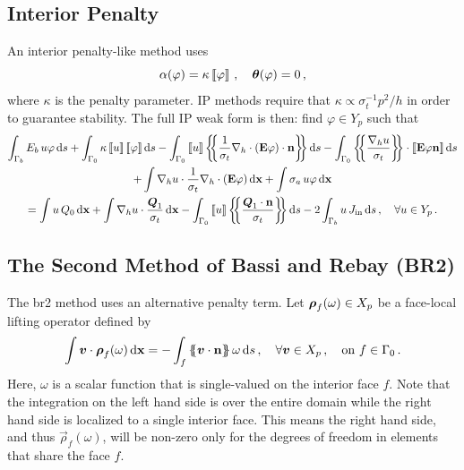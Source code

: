 \documentclass[../doc.tex]{subfiles}
\begin{document}
\subsection{Interior Penalty} \label{dgvef_sec:ip}
An interior penalty-like method uses 
	\begin{equation}
		\alpha(\varphi) = \kappa \left\llbracket\varphi \right\rrbracket \,, \quad \boldsymbol{\theta}(\varphi) = 0 \,, 
	\end{equation}
where $\kappa$ is the penalty parameter. IP methods require that $\kappa \propto \sigma_t^{-1} p^2/h$ in order to guarantee stability. The full IP weak form is then: find $\varphi \in Y_p$ such that 
	\begin{multline} \label{dgvef:ip}
		\int_{\Gamma_b} E_b\, u \varphi \ud s + \int_{\Gamma_0} \kappa \jump{u} \jump{\varphi} \ud s - \int_{\Gamma_0} \jump{u} \avg{\frac{1}{\sigma_t}\nablah\cdot\paren{\E\varphi}\cdot\n} \ud s - \int_{\Gamma_0} \avg{\frac{\nablah u}{\sigma_t}} \cdot \jump{\E\varphi\n} \ud s \\
		+ \int \nablah u \cdot \frac{1}{\sigma_t}\nablah\cdot\paren{\E\varphi} \ud \x + \int \sigma_a\, u \varphi \ud \x \\ 
		= \int u\, Q_0 \ud \x + \int \nablah u \cdot \frac{\vec{Q}_1}{\sigma_t} \ud \x - \int_{\Gamma_0} \jump{u} \avg{\frac{\vec{Q}_1\cdot\n}{\sigma_t}} \ud s - 2\int_{\Gamma_b} u\, \Jin \ud s \,, \quad \forall u \in Y_p \,. 
	\end{multline}

\subsection{The Second Method of Bassi and Rebay (BR2)}
The \gls{br2} method uses an alternative penalty term. Let $\boldsymbol{\rho}_f(\omega)\in X_p$ be a face-local lifting operator defined by 
	\begin{equation} \label{dgvef:rhof}
		\int \boldsymbol{v}\cdot\boldsymbol{\rho}_f(\omega) \mathop{}\!\mathrm{d} \boldsymbol{\mathrm{x}} = -\int_f \left\{\!\!\left\{\boldsymbol{v} \cdot\boldsymbol{\mathrm{n}}\right\}\!\!\right\} \omega \mathop{}\!\mathrm{d} s \,, \quad \forall \boldsymbol{v} \in X_p\,, \quad \text{on} \ f\in \Gamma_0 \,. 
	\end{equation}
Here, $\omega$ is a scalar function that is single-valued on the interior face $f$. Note that the integration on the left hand side is over the entire domain while the right hand side is localized to a single interior face. This means the right hand side, and thus $\vec{\rho}_f(\omega)$, will be non-zero only for the degrees of freedom in elements that share the face $f$. 
\end{document}
